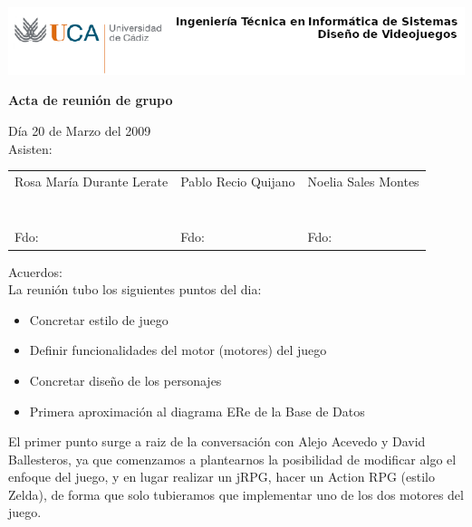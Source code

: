\documentclass[a4paper,10pt]{article}
\begin{document}
\includegraphics[scale=0.6]{../uca.png}

\begin{center}
  \noindent \huge\textbf{ Acta de reunión de grupo}\\
\end{center}

\noindent Día 20 de Marzo del 2009\\

\noindent Asisten:

\begin{center}
\begin{tabular}{|m{5.2cm}|m{5.2cm}|m{5.2cm}|}
  \hline
  Rosa María Durante Lerate & Pablo Recio Quijano & Noelia Sales Montes\\
  & & \\
  & & \\
  & & \\
  & & \\
  & & \\
  & & \\
  & & \\
  Fdo: & Fdo: & Fdo: \\
  \hline
\end{tabular}
\end{center}

\noindent Acuerdos:\\

\noindent La reunión tubo los siguientes puntos del dia:

\begin{itemize}
\item Concretar estilo de juego
\item Definir funcionalidades del motor (motores) del juego
\item Concretar diseño de los personajes
\item Primera aproximación al diagrama ERe de la Base de Datos
\end{itemize}

\noindent El primer punto surge a raiz de la conversación con Alejo
Acevedo y David Ballesteros, ya que comenzamos a plantearnos la
posibilidad de modificar algo el enfoque del juego, y en lugar
realizar un jRPG, hacer un Action RPG (estilo Zelda), de forma que
solo tubieramos que implementar uno de los dos motores del juego.\\
\end{document}
